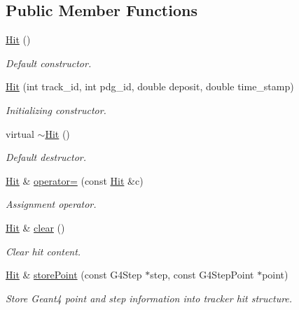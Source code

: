 \subsection*{Public Member Functions}
\begin{DoxyCompactItemize}
\item 
\hyperlink{class_d_d4hep_1_1_simulation_1_1_geant4_tracker_1_1_hit_a0a9d1a37e9de22e048ad01d09abeea3a}{Hit} ()
\begin{DoxyCompactList}\small\item\em Default constructor. \item\end{DoxyCompactList}\item 
\hyperlink{class_d_d4hep_1_1_simulation_1_1_geant4_tracker_1_1_hit_a2f02d476b53ca077e7bb1326e99a4267}{Hit} (int track\_\-id, int pdg\_\-id, double deposit, double time\_\-stamp)
\begin{DoxyCompactList}\small\item\em Initializing constructor. \item\end{DoxyCompactList}\item 
virtual \hyperlink{class_d_d4hep_1_1_simulation_1_1_geant4_tracker_1_1_hit_ad443787a7dd9e83a0b93248f823b375d}{$\sim$Hit} ()
\begin{DoxyCompactList}\small\item\em Default destructor. \item\end{DoxyCompactList}\item 
\hyperlink{class_d_d4hep_1_1_simulation_1_1_geant4_tracker_1_1_hit}{Hit} \& \hyperlink{class_d_d4hep_1_1_simulation_1_1_geant4_tracker_1_1_hit_a97a85ebcb7994f55275d4479ca5c4a6a}{operator=} (const \hyperlink{class_d_d4hep_1_1_simulation_1_1_geant4_tracker_1_1_hit}{Hit} \&c)
\begin{DoxyCompactList}\small\item\em Assignment operator. \item\end{DoxyCompactList}\item 
\hyperlink{class_d_d4hep_1_1_simulation_1_1_geant4_tracker_1_1_hit}{Hit} \& \hyperlink{class_d_d4hep_1_1_simulation_1_1_geant4_tracker_1_1_hit_aafcd9c0b786c16d9db3de2de661c9200}{clear} ()
\begin{DoxyCompactList}\small\item\em Clear hit content. \item\end{DoxyCompactList}\item 
\hyperlink{class_d_d4hep_1_1_simulation_1_1_geant4_tracker_1_1_hit}{Hit} \& \hyperlink{class_d_d4hep_1_1_simulation_1_1_geant4_tracker_1_1_hit_a8f2563ce396b2d2f7f6c6534aed3cdb4}{storePoint} (const G4Step $\ast$step, const G4StepPoint $\ast$point)
\begin{DoxyCompactList}\small\item\em Store Geant4 point and step information into tracker hit structure. \item\end{DoxyCompactList}\end{DoxyCompactItemize}
